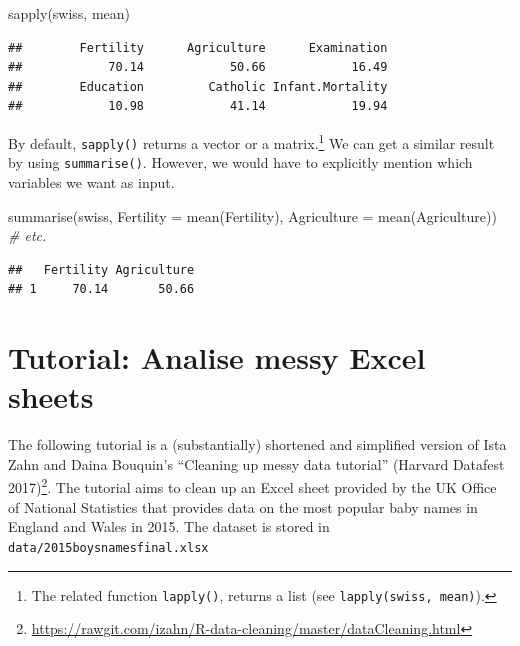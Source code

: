 \documentclass[
  12pt,
]{style/krantz}
\newenvironment{Shaded}{\begin{snugshade}}{\end{snugshade}}
\newcommand{\AttributeTok}[1]{\textcolor[rgb]{0.77,0.63,0.00}{#1}}
\newcommand{\CommentTok}[1]{\textcolor[rgb]{0.56,0.35,0.01}{\textit{#1}}}
\newcommand{\FunctionTok}[1]{\textcolor[rgb]{0.00,0.00,0.00}{#1}}
\newcommand{\NormalTok}[1]{#1}
\renewcommand{\href}[2]{#2\footnote{\url{#1}}}
\begin{document}
\begin{Shaded}
\begin{Highlighting}[]
\FunctionTok{sapply}\NormalTok{(swiss, mean)}
\end{Highlighting}
\end{Shaded}

\begin{verbatim}
##        Fertility      Agriculture      Examination 
##            70.14            50.66            16.49 
##        Education         Catholic Infant.Mortality 
##            10.98            41.14            19.94
\end{verbatim}

By default, \texttt{sapply()} returns a vector or a matrix.\footnote{The related function \texttt{lapply()}, returns a list (see \texttt{lapply(swiss,\ mean)}).} We can get a similar result by using \texttt{summarise()}. However, we would have to explicitly mention which variables we want as input.

\begin{Shaded}
\begin{Highlighting}[]
\FunctionTok{summarise}\NormalTok{(swiss,}
          \AttributeTok{Fertility =} \FunctionTok{mean}\NormalTok{(Fertility),}
          \AttributeTok{Agriculture =} \FunctionTok{mean}\NormalTok{(Agriculture)) }\CommentTok{\# etc.}
\end{Highlighting}
\end{Shaded}

\begin{verbatim}
##   Fertility Agriculture
## 1     70.14       50.66
\end{verbatim}

\hypertarget{tutorial-analise-messy-excel-sheets}{%
\section{Tutorial: Analise messy Excel sheets}\label{tutorial-analise-messy-excel-sheets}}

The following tutorial is a (substantially) shortened and simplified version of Ista Zahn and Daina Bouquin's \href{https://rawgit.com/izahn/R-data-cleaning/master/dataCleaning.html}{``Cleaning up messy data tutorial'' (Harvard Datafest 2017)}. The tutorial aims to clean up an Excel sheet provided by the UK Office of National Statistics that provides data on the most popular baby names in England and Wales in 2015. The dataset is stored in \texttt{data/2015boysnamesfinal.xlsx}
\end{document}
